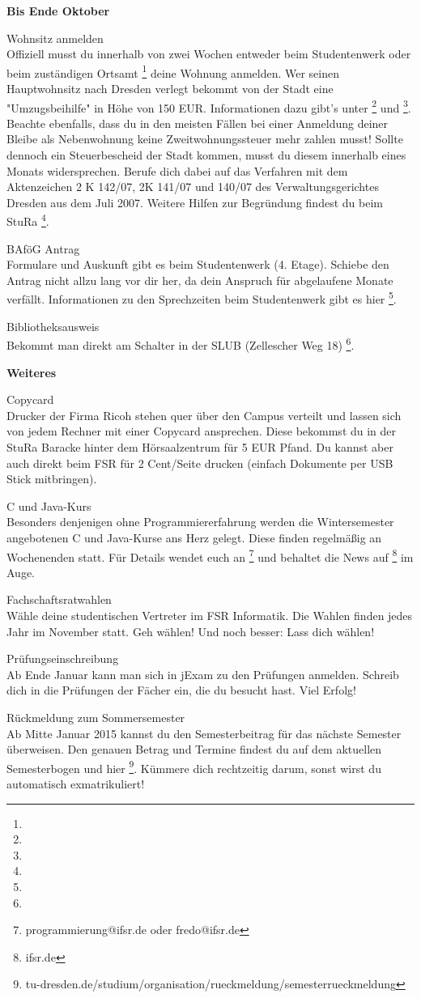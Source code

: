 \textbf{Bis Ende Oktober}

Wohnsitz anmelden \\
Offiziell musst du innerhalb von zwei Wochen entweder beim Studentenwerk oder beim zuständigen Ortsamt \footnote{} deine Wohnung anmelden.
Wer seinen Hauptwohnsitz nach Dresden verlegt bekommt von der Stadt eine "Umzugsbeihilfe" in Höhe von 150 EUR.
Informationen dazu gibt's unter \footnote{} und \footnote{}.
Beachte ebenfalls, dass du in den meisten Fällen bei einer Anmeldung deiner Bleibe als Nebenwohnung keine Zweitwohnungssteuer mehr zahlen musst!
Sollte dennoch ein Steuerbescheid der Stadt kommen, musst du diesem innerhalb eines Monats widersprechen.
Berufe dich dabei auf das Verfahren mit dem Aktenzeichen 2 K 142/07, 2K 141/07 und 140/07 des Verwaltungsgerichtes Dresden aus dem Juli 2007.
Weitere Hilfen zur Begründung findest du beim StuRa \footnote{}.

BAföG Antrag \\
Formulare und Auskunft gibt es beim Studentenwerk (4. Etage).
Schiebe den Antrag nicht allzu lang vor dir her, da dein Anspruch für abgelaufene Monate verfällt.
Informationen zu den Sprechzeiten beim Studentenwerk gibt es hier \footnote{}.

Bibliotheksausweis \\
Bekommt man direkt am Schalter in der SLUB (Zellescher Weg 18) \footnote{}.

\textbf{Weiteres}

Copycard \\
Drucker der Firma Ricoh stehen quer über den Campus verteilt und lassen sich von jedem Rechner mit einer Copycard ansprechen.
Diese bekommst du in der StuRa Baracke hinter dem Hörsaalzentrum für 5 EUR Pfand. Du kannst aber auch direkt beim FSR für 2 Cent/Seite drucken (einfach Dokumente per USB Stick mitbringen).

C und Java-Kurs \\
Besonders denjenigen ohne Programmiererfahrung werden die Wintersemester angebotenen C und Java-Kurse ans Herz gelegt.
Diese finden regelmäßig an Wochenenden statt.
Für Details wendet euch an \footnote{programmierung@ifsr.de oder fredo@ifsr.de} und behaltet die News auf \footnote{ifsr.de} im Auge.

Fachschaftsratwahlen \\
Wähle deine studentischen Vertreter im FSR Informatik.
Die Wahlen finden jedes Jahr im November statt.
Geh wählen!
Und noch besser: Lass dich wählen!

Prüfungseinschreibung \\
Ab Ende Januar kann man sich in jExam zu den Prüfungen anmelden.
Schreib dich in die Prüfungen der Fächer ein, die du besucht hast.
Viel Erfolg!

Rückmeldung zum Sommersemester \\
Ab Mitte Januar 2015 kannst du den Semesterbeitrag für das nächste Semester überweisen.
Den genauen Betrag und Termine findest du auf dem aktuellen Semesterbogen und hier \footnote{tu-dresden.de/studium/organisation/rueckmeldung/semesterrueckmeldung}.
Kümmere dich rechtzeitig darum, sonst wirst du automatisch exmatrikuliert!